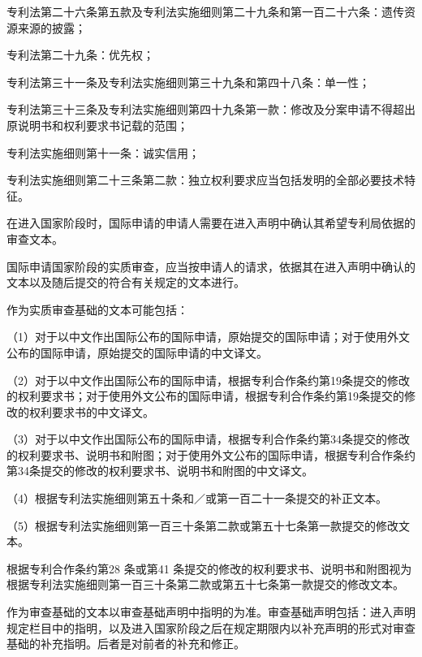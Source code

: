 专利法第二十六条第五款及专利法实施细则第二十九条和第一百二十六条：遗传资源来源的披露；

专利法第二十九条：优先权；

专利法第三十一条及专利法实施细则第三十九条和第四十八条：单一性；

专利法第三十三条及专利法实施细则第四十九条第一款：修改及分案申请不得超出原说明书和权利要求书记载的范围；

专利法实施细则第十一条：诚实信用；

专利法实施细则第二十三条第二款：独立权利要求应当包括发明的全部必要技术特征。

在进入国家阶段时，国际申请的申请人需要在进入声明中确认其希望专利局依据的审查文本。

国际申请国家阶段的实质审查，应当按申请人的请求，依据其在进入声明中确认的文本以及随后提交的符合有关规定的文本进行。

作为实质审查基础的文本可能包括：

{\setlength{\parindent}{17.1bp}（1）对于以中文作出国际公布的国际申请，原始提交的国际申请；对于使用外文公布的国际申请，原始提交的国际申请的中文译文。\par}

{\setlength{\parindent}{17.1bp}（2）对于以中文作出国际公布的国际申请，根据专利合作条约第19条提交的修改的权利要求书；对于使用外文公布的国际申请，根据专利合作条约第19条提交的修改的权利要求书的中文译文。\par}

{\setlength{\parindent}{17.1bp}（3）对于以中文作出国际公布的国际申请，根据专利合作条约第34条提交的修改的权利要求书、说明书和附图；对于使用外文公布的国际申请，根据专利合作条约第34条提交的修改的权利要求书、说明书和附图的中文译文。\par}

{\setlength{\parindent}{17.1bp}（4）根据专利法实施细则第五十条和／或第一百二十一条提交的补正文本。\par}

{\setlength{\parindent}{17.1bp}（5）根据专利法实施细则第一百三十条第二款或第五十七条第一款提交的修改文本。\par}

根据专利合作条约第28 条或第41 条提交的修改的权利要求书、说明书和附图视为根据专利法实施细则第一百三十条第二款或第五十七条第一款提交的修改文本。

作为审查基础的文本以审查基础声明中指明的为准。审查基础声明包括：进入声明规定栏目中的指明，以及进入国家阶段之后在规定期限内以补充声明的形式对审查基础的补充指明。后者是对前者的补充和修正。

